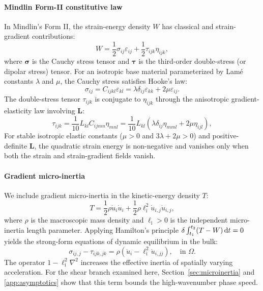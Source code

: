 \paragraph{Mindlin Form-II constitutive law}
In Mindlin's Form II, the strain-energy density $W$ has classical and strain-gradient contributions:
\begin{equation}
W = \frac{1}{2}\sigma_{ij}\varepsilon_{ij} + \frac{1}{2}\tau_{ijk}\eta_{ijk},
\label{eq:strain_energy_W}
\end{equation}
where $\bm\sigma$ is the Cauchy stress tensor and $\bm\tau$ is the third-order double-stress (or dipolar stress) tensor. For an isotropic base material parameterized by Lam\'e constants $\lambda$ and $\mu$, the Cauchy stress satisfies Hooke's law:
\begin{equation}
\sigma_{ij} = C_{ijkl}\varepsilon_{kl} = \lambda \delta_{ij}\varepsilon_{kk} + 2\mu \varepsilon_{ij}.
\label{eq:cauchy_stress}
\end{equation}
The double-stress tensor $\tau_{ijk}$ is conjugate to $\eta_{ijk}$ through the anisotropic gradient-elasticity law involving $\mathbf{L}$:
\begin{equation}
\tau_{ijk} = \frac{1}{10} L_{kl} C_{ijmn}\eta_{mnl} = \frac{1}{10} L_{kl}\left(\lambda \delta_{ij}\eta_{mml} + 2\mu \eta_{ijl}\right),
\label{eq:double_stress}
\end{equation}
For stable isotropic elastic constants ($\mu>0$ and $3\lambda+2\mu>0$) and positive-definite $\mathbf{L}$, the quadratic strain energy is non-negative and vanishes only when both the strain and strain-gradient fields vanish.

\paragraph{Gradient micro-inertia}
We include gradient micro-inertia in the kinetic-energy density $T$:
\begin{equation}
T = \frac{1}{2}\rho \dot u_i \dot u_i + \frac{1}{2}\rho \ell_{\mathrm{i}}^2 \dot u_{i,j}\dot u_{i,j},
\label{eq:kinetic_energy_T}
\end{equation}
where $\rho$ is the macroscopic mass density and $\ell_{\mathrm{i}} > 0$ is the independent micro-inertia length parameter. Applying Hamilton's principle $\delta \int_{t_1}^{t_2} (T - W)\,\mathrm{d} t = 0$ yields the strong-form equations of dynamic equilibrium in the bulk:
\begin{equation}
\sigma_{ij,j} - \tau_{ijk,jk} = \rho\left(\ddot u_i - \ell_{\mathrm{i}}^2 \ddot u_{i,jj}\right), \quad \text{in } \Omega.
\label{eq:strong_form}
\end{equation}
The operator $1-\ell_{\mathrm{i}}^2\nabla^2$ increases the effective inertia of spatially varying acceleration. For the shear branch examined here, Section~\ref{sec:microinertia} and \ref{app:asymptotics} show that this term bounds the high-wavenumber phase speed.

